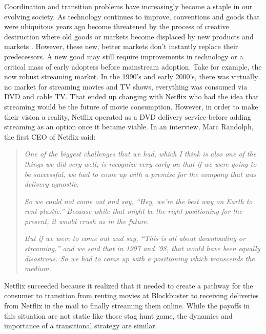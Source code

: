 Coordination and transition problems have increasingly become a staple in our evolving society. As technology continues to improve, conventions and goods that were ubiquitous years ago become threatened by the process of creative destruction where old goods or markets become displaced by new products and markets \citep{schumpeter2013capitalism}. However, these new, better markets don't instantly replace their predecessors. A new good may still require improvements in technology or a critical mass of early adopters before mainstream adoption. Take for example, the now robust streaming market. In the 1990's and early 2000's, there was virtually no market for streaming movies and TV shows, everything was consumed via DVD and cable TV. That ended up changing with Netflix who had the idea that streaming would be the future of movie consumption. However, in order to make their vision a reality, Netflix operated as a DVD delivery service before adding streaming as an option once it became viable. In an interview, Marc Randolph, the first CEO of Netflix said:

\begin{quote}
    \textit{One of the biggest challenges that we had, which I think is also one of the things we did very well, is recognize very early on that if we were going to be successful, we had to come up with a premise for the company that was delivery agnostic.}
    
    \textit{So we could not come out and say, “Hey, we're the best way on Earth to rent plastic.” Because while that might be the right positioning for the present, it would crush us in the future.}
    
    \textit{But if we were to come out and say, “This is all about downloading or streaming,” and we said that in 1997 and '98, that would have been equally disastrous. So we had to come up with a positioning which transcends the medium.}
\end{quote}

Netflix succeeded because it realized that it needed to create a pathway for the consumer to transition from renting movies at Blockbuster to receiving deliveries from Netflix in the mail to finally streaming them online. While the payoffs in this situation are not static like those stag hunt game, the dynamics and importance of a transitional strategy are similar.

